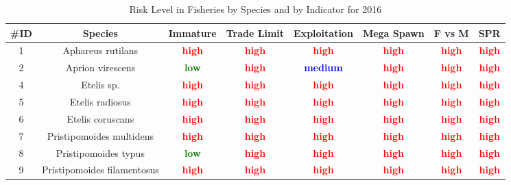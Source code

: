 \documentclass{report}\usepackage[]{graphicx}\usepackage[]{color}
\begin{document}
\begin{table}[ht]
\centering
\caption{Risk Level in Fisheries by Species and by Indicator for 2016} 
{\small
\begin{tabular}{cccccccc}
  \hline
\#ID & Species & Immature & Trade Limit & Exploitation & Mega Spawn & F vs M & SPR \\ 
  \hline
  1 & Aphareus rutilans & \textcolor{red}{\textbf{high}} & \textcolor{red}{\textbf{high}} & \textcolor{red}{\textbf{high}} & \textcolor{red}{\textbf{high}} & \textcolor{red}{\textbf{high}} & \textcolor{red}{\textbf{high}} \\ 
    2 & Aprion virescens & \textcolor{green}{\textbf{low}} & \textcolor{red}{\textbf{high}} & \textcolor{blue}{\textbf{medium}} & \textcolor{red}{\textbf{high}} & \textcolor{red}{\textbf{high}} & \textcolor{red}{\textbf{high}} \\ 
    4 & Etelis sp. & \textcolor{red}{\textbf{high}} & \textcolor{red}{\textbf{high}} & \textcolor{red}{\textbf{high}} & \textcolor{red}{\textbf{high}} & \textcolor{red}{\textbf{high}} & \textcolor{red}{\textbf{high}} \\ 
    5 & Etelis radiosus & \textcolor{red}{\textbf{high}} & \textcolor{red}{\textbf{high}} & \textcolor{red}{\textbf{high}} & \textcolor{red}{\textbf{high}} & \textcolor{red}{\textbf{high}} & \textcolor{red}{\textbf{high}} \\ 
    6 & Etelis coruscans & \textcolor{red}{\textbf{high}} & \textcolor{red}{\textbf{high}} & \textcolor{red}{\textbf{high}} & \textcolor{red}{\textbf{high}} & \textcolor{red}{\textbf{high}} & \textcolor{red}{\textbf{high}} \\ 
    7 & Pristipomoides multidens & \textcolor{red}{\textbf{high}} & \textcolor{red}{\textbf{high}} & \textcolor{red}{\textbf{high}} & \textcolor{red}{\textbf{high}} & \textcolor{red}{\textbf{high}} & \textcolor{red}{\textbf{high}} \\ 
    8 & Pristipomoides typus & \textcolor{green}{\textbf{low}} & \textcolor{red}{\textbf{high}} & \textcolor{red}{\textbf{high}} & \textcolor{red}{\textbf{high}} & \textcolor{red}{\textbf{high}} & \textcolor{red}{\textbf{high}} \\ 
    9 & Pristipomoides filamentosus & \textcolor{red}{\textbf{high}} & \textcolor{red}{\textbf{high}} & \textcolor{red}{\textbf{high}} & \textcolor{red}{\textbf{high}} & \textcolor{red}{\textbf{high}} & \textcolor{red}{\textbf{high}} \\ 

\end{tabular}}
\end{table}
\end{document}
